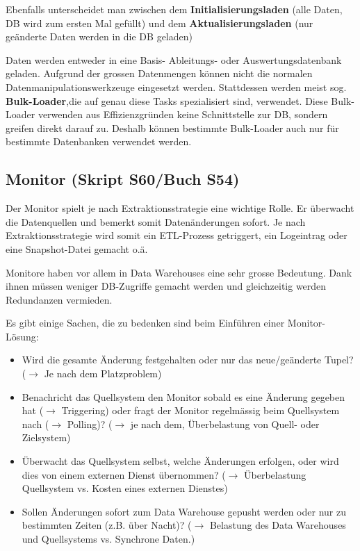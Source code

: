 \documentclass[a4paper, 11pt, nofootinbib]{article}
\begin{document}
Ebenfalls unterscheidet man zwischen dem \textbf{Initialisierungsladen} (alle Daten, DB wird zum ersten Mal gefüllt) und dem \textbf{Aktualisierungsladen} (nur geänderte Daten werden in die DB geladen)

Daten werden entweder in eine Basis- Ableitungs- oder Auswertungsdatenbank geladen. Aufgrund der grossen Datenmengen können nicht die normalen Datenmanipulationswerkzeuge eingesetzt werden. Stattdessen werden meist sog. \textbf{Bulk-Loader},die auf genau diese Tasks spezialisiert sind, verwendet. Diese Bulk-Loader verwenden aus Effizienzgründen keine Schnittstelle zur DB, sondern greifen direkt darauf zu. Deshalb können bestimmte Bulk-Loader auch nur für bestimmte Datenbanken verwendet werden. 

\subsection{Monitor (Skript S60/Buch S54)}
Der Monitor spielt je nach Extraktionsstrategie eine wichtige Rolle. Er überwacht die Datenquellen und bemerkt somit Datenänderungen sofort. Je nach Extraktionsstrategie wird somit ein ETL-Prozess getriggert, ein Logeintrag oder eine Snapshot-Datei gemacht o.ä. 

Monitore haben vor allem in Data Warehouses eine sehr grosse Bedeutung. Dank ihnen müssen weniger DB-Zugriffe gemacht werden und gleichzeitig werden Redundanzen vermieden.

\vspace{10px}

\noindent Es gibt einige Sachen, die zu bedenken sind beim Einführen einer Monitor-Lösung:
\begin{itemize}
	\item Wird die gesamte Änderung festgehalten oder nur das neue/geänderte Tupel? ($\rightarrow$ Je nach dem Platzproblem)
	\item Benachricht das Quellsystem den Monitor sobald es eine Änderung gegeben hat ($\rightarrow$ Triggering) oder fragt der Monitor regelmässig beim Quellsystem nach ($\rightarrow$ Polling)? ($\rightarrow$ je nach dem, Überbelastung von Quell- oder Zielsystem)
	\item Überwacht das Quellsystem selbst, welche Änderungen erfolgen, oder wird dies von einem externen Dienst übernommen? ($\rightarrow$ Überbelastung Quellsystem vs. Kosten eines externen Dienstes)
	\item Sollen Änderungen sofort zum Data Warehouse gepusht werden oder nur zu bestimmten Zeiten (z.B. über Nacht)? ($\rightarrow$ Belastung des Data Warehouses und Quellsystems vs. Synchrone Daten.)
	
\end{itemize}
\end{document}
